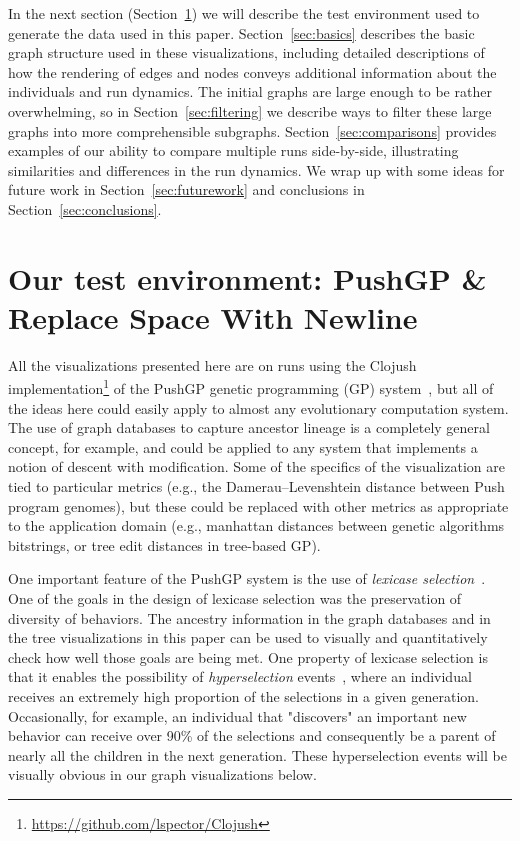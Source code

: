 \documentclass{sig-alternate}
\begin{document}
In the next section (Section~\ref{sec:testEnv}) we will describe the test
environment used to generate the data used in this paper. Section~\ref{sec:basics}
describes the basic graph structure used in these visualizations, including
detailed descriptions of how the rendering of edges and nodes conveys additional
information about the individuals and run dynamics. The initial graphs are large
enough to be rather overwhelming, so in Section~\ref{sec:filtering} we describe
ways to filter these large graphs into more comprehensible subgraphs. 
Section~\ref{sec:comparisons} provides examples of our ability to compare multiple
runs side-by-side, illustrating similarities and differences in the run dynamics.
We wrap up with some ideas for future work in Section~\ref{sec:futurework} and
conclusions in Section~\ref{sec:conclusions}.

\section{Our test environment: PushGP \& Replace Space With Newline}
\label{sec:testEnv}

All the visualizations presented here are on runs using the Clojush
implementation\footnote{\url{https://github.com/lspector/Clojush}} of the 
PushGP genetic programming (GP) system~\cite{1068292,spector:2002:GPEM}, 
but all of the ideas here
could easily apply to almost any evolutionary computation system. The use
of graph databases to capture ancestor lineage is a completely general
concept, for example, and could be applied to any system that implements a
notion of descent with modification. Some of the specifics of the visualization
are tied to particular metrics (e.g., the Damerau--Levenshtein distance
between Push program genomes), but these could be replaced with other
metrics as appropriate to the application domain (e.g., manhattan distances
between genetic algorithms bitstrings, or tree edit distances in
tree-based GP).

One important feature of the PushGP system is the use of \emph{lexicase
selection}~\cite{Helmuth:2015:ieeeTEC}. One of the goals in the design of
lexicase selection was the preservation of diversity of behaviors. The
ancestry information in the graph databases and in the tree visualizations 
in this paper can be used to visually and quantitatively check how
well those goals are being met. One property of lexicase selection is
that it enables the possibility of \emph{hyperselection} events~\cite{Helmuth:2016:GECCO},
where an individual receives an extremely high proportion of the selections
in a given generation. Occasionally, for example, an individual that
"discovers" an important new behavior can receive over 90\% of the selections
and consequently be a parent of nearly all the children in the next generation.
These hyperselection events will be visually obvious in our graph visualizations
below.
\end{document}
